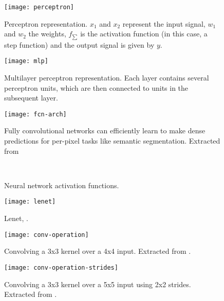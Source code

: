 \begin{figure}[!htb]
\centering
\texttt{[image: perceptron]}
\caption{Perceptron representation. $x_{1}$ and $x_{2}$ represent the input signal, $w_{1}$ and $w_{2}$ the weights, $f_{\sum}$ is the activation function (in this case, a step function) and the output signal is given by $y$.}
\label{perceptron}
\end{figure}

\begin{figure}[!htb]
\centering
\texttt{[image: mlp]}
\caption{Multilayer perceptron representation. Each layer contains several perceptron units, which are then connected to units in the subsequent layer.}
\label{mlp}
\end{figure}

\begin{figure}[!htb]
\centering
\texttt{[image: fcn-arch]}
\caption{Fully convolutional networks can efficiently learn to make dense predictions for
per-pixel tasks like semantic segmentation. Extracted from \cite{long2015fully}}
\label{fcn-arch}
\end{figure}

\begin{figure}[!htpb]
\centering
\hspace*{0.2in} %
\\
\hspace*{0.2in} %


\caption{Neural network activation functions. } \label{fig:activation}
\end{figure}

\begin{figure}[!htb]
\centering
\texttt{[image: lenet]}
\caption{Lenet, \cite{lecun1998gradient}.}
\label{lenet}
\end{figure}

\begin{figure}[!htb]
\centering
\texttt{[image: conv-operation]}
\caption{Convolving a 3x3 kernel over a 4x4 input. Extracted from \cite{dumoulin2016guide}. }
\label{fig:convop}
\end{figure}

\begin{figure}[!htb]
\centering
\texttt{[image: conv-operation-strides]}
\caption{Convolving a 3x3 kernel over a 5x5 input using 2x2 strides. Extracted from \cite{dumoulin2016guide}. }
\label{fig:convop-stride}
\end{figure}

